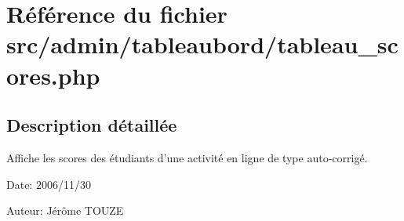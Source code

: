 \section{Référence du fichier src/admin/tableaubord/tableau\_\-scores.php}
\label{tableau__scores_8php}


\subsection{Description détaillée}
Affiche les scores des étudiants d'une activité en ligne de type auto-corrigé. 

\begin{Desc}
\item[Date:]2006/11/30\end{Desc}
\begin{Desc}
\item[Auteur:]Jérôme TOUZE \end{Desc}


